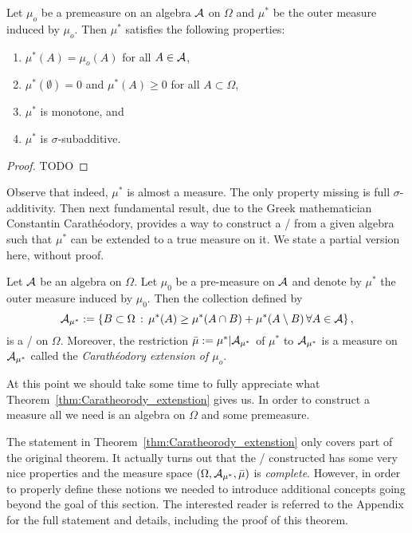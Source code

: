 \begin{proposition}
Let $\mu_o$ be a premeasure on an algebra $\mathcal A$ on $\Omega$ and $\mu^\ast$ be the outer measure induced by $\mu_o$. Then $\mu^\ast$ satisfies the following properties:
\begin{enumerate}
\item $\mu^\ast(A) = \mu_o(A)$ for all $A \in \mathcal A$,
\item $\mu^\ast(\emptyset) = 0$ and $\mu^\ast(A) \ge 0$ for all $A \subset \Omega$,
\item $\mu^\ast$ is monotone, and
\item $\mu^\ast$ is $\sigma$-subadditive.
\end{enumerate}
\end{proposition}

\begin{proof}
TODO
\end{proof}

Observe that indeed, $\mu^\ast$ is almost a measure. The only property missing is full $\sigma$-additivity. Then next fundamental result, due to the Greek mathematician Constantin Carath\'{e}odory, provides a way to construct a \sigalg/ from a given algebra such that $\mu^\ast$ can be extended to a true measure on it. We state a partial version here, without proof.

\begin{theorem}\label{thm:Caratheorody_extenstion}
Let $\mathcal A$ be an algebra on $\Omega$. Let $\mu_0$ be a pre-measure on $\mathcal A$ and denote by $\mu^\ast$ the outer measure induced by $\mu_0$. Then the collection defined by
\[
	\mathcal A_{\mu^\ast} := \left\{B \subset \Omega \, : \, \mu^\ast(A) \ge \mu^\ast(A \cap B) + \mu^\ast(A \setminus B) \, \forall A \in \mathcal A\right\},
\] 
is a \sigalg/ on $\Omega$. Moreover, the restriction $\bar{\mu} := \mu^\ast|\mathcal A_{\mu^\ast}$ of $\mu^\ast$ to $\mathcal A_{\mu^\ast}$ is a measure on $\mathcal A_{\mu^\ast}$ called the \emph{Carath\'{e}odory extension of $\mu_o$}.
\end{theorem}

At this point we should take some time to fully appreciate what Theorem~\ref{thm:Caratheorody_extenstion} gives us. In order to construct a measure all we need is an algebra on $\Omega$ and some premeasure.  

\begin{remark}
The statement in Theorem~\ref{thm:Caratheorody_extenstion} only covers part of the original theorem. It actually turns out that the \sigalg/ constructed has some very nice properties and the measure space $(\Omega, \mathcal A_{\mu^\ast}, \bar{\mu})$ is \emph{complete}. However, in order to properly define these notions we needed to introduce additional concepts going beyond the goal of this section. The interested reader is referred to the Appendix for the full statement and details, including the proof of this theorem. 
\end{remark}

